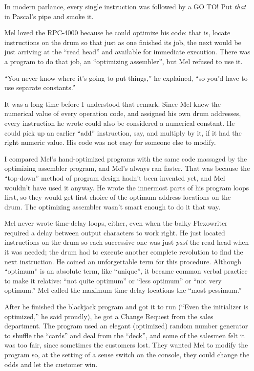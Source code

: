 \documentclass[12pt]{article}
\begin{document}
\bigskip
\noindent
In modern parlance,
every single instruction was followed by a GO TO!
Put {\it that} in Pascal's pipe and smoke it.

\bigskip
\noindent
Mel loved the RPC-4000
because he could optimize his code:
that is, locate instructions on the drum
so that just as one finished its job,
the next would be just arriving at the ``read head''
and available for immediate execution.
There was a program to do that job,
an ``optimizing assembler'',
but Mel refused to use it.

\bigskip
\noindent
``You never know where it's going to put things,''
he explained, ``so you'd have to use separate constants.''

\bigskip
\noindent
It was a long time before I understood that remark.
Since Mel knew the numerical value
of every operation code,
and assigned his own drum addresses,
every instruction he wrote could also be considered
a numerical constant.
He could pick up an earlier ``add'' instruction, say,
and multiply by it,
if it had the right numeric value.
His code was not easy for someone else to modify.

\bigskip
\noindent
I compared Mel's hand-optimized programs
with the same code massaged by the optimizing assembler program,
and Mel's always ran faster.
That was because the ``top-down'' method of program design
hadn't been invented yet,
and Mel wouldn't have used it anyway.
He wrote the innermost parts of his program loops first,
so they would get first choice
of the optimum address locations on the drum.
The optimizing assembler wasn't smart enough to do it that way.

\bigskip
\noindent
Mel never wrote time-delay loops, either,
even when the balky Flexowriter
required a delay between output characters to work right.
He just located instructions on the drum
so each successive one was just {\it past} the read head
when it was needed;
the drum had to execute another complete revolution
to find the next instruction.
He coined an unforgettable term for this procedure.
Although ``optimum'' is an absolute term,
like ``unique'', it became common verbal practice
to make it relative:
``not quite optimum'' or ``less optimum''
or ``not very optimum.''
Mel called the maximum time-delay locations
the ``most pessimum.''

\bigskip
\noindent
After he finished the blackjack program
and got it to run
(``Even the initializer is optimized,''
he said proudly),
he got a Change Request from the sales department.
The program used an elegant (optimized)
random number generator
to shuffle the ``cards'' and deal from the ``deck'',
and some of the salesmen felt it was too fair,
since sometimes the customers lost.
They wanted Mel to modify the program
so, at the setting of a sense switch on the console,
they could change the odds and let the customer win.
\end{document}
